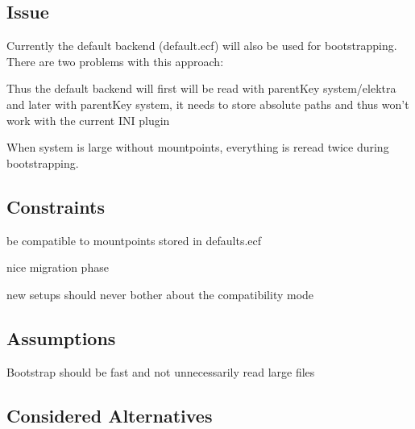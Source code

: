 \subsection*{Issue}

Currently the default backend (default.\+ecf) will also be used for bootstrapping. There are two problems with this approach\+:


\begin{DoxyEnumerate}
\item Thus the default backend will first will be read with parent\+Key {\ttfamily system/elektra} and later with parent\+Key {\ttfamily system}, it needs to store absolute paths and thus won't work with the current I\+N\+I plugin
\item When {\ttfamily system} is large without mountpoints, everything is reread twice during bootstrapping.
\end{DoxyEnumerate}

\subsection*{Constraints}


\begin{DoxyItemize}
\item be compatible to mountpoints stored in {\ttfamily defaults.\+ecf}
\item nice migration phase
\item new setups should never bother about the compatibility mode
\end{DoxyItemize}

\subsection*{Assumptions}


\begin{DoxyItemize}
\item Bootstrap should be fast and not unnecessarily read large files
\end{DoxyItemize}

\subsection*{Considered Alternatives}


